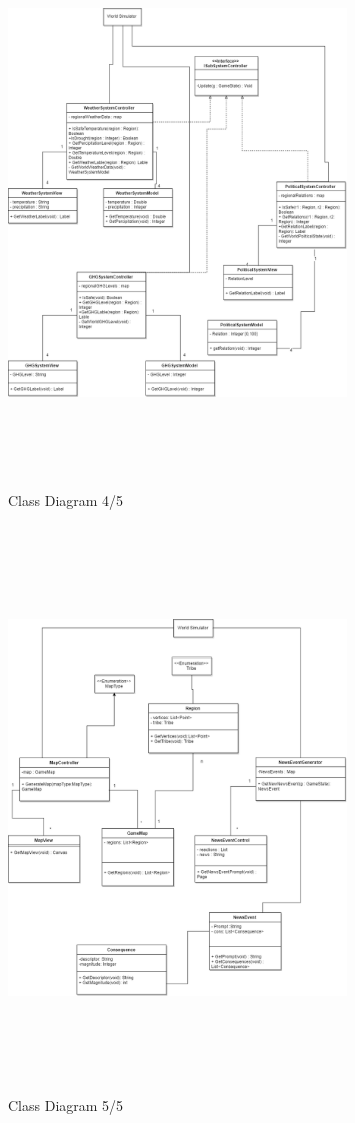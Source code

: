 \documentclass[]{article}
\begin{document}
\pagebreak
\begin{figure}[h]
    \centering
    \includegraphics[width=0.8\textwidth , height=15cm, keepaspectratio]{dcdSS}
    \caption{Class Diagram 4/5}
    \label{fig:dcdTL}
\end{figure}

\pagebreak
\begin{figure}[h]
    \centering
    \includegraphics[width=0.8\textwidth , height=15cm, keepaspectratio]{dcdNM}
    \caption{Class Diagram 5/5}
    \label{fig:dcdTL}
\end{figure}
\end{document}
